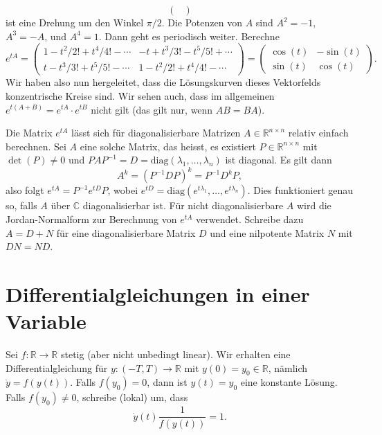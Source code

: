 \documentclass[../main.tex]{subfiles}
\begin{document}
\begin{examples}
\begin{enumerate}[(1)]
\[\begin{pmatrix}
        \end{pmatrix}
      \]
      ist eine Drehung um den Winkel $\pi/2$.
      Die Potenzen von $A$ sind
      $A^2 = -1$, $A^3 = -A$, und $A^4 = 1$.
      Dann geht es periodisch weiter.
      Berechne
      \[
        e^{tA} =
        \begin{pmatrix}
          1 - t^2/2! + t^4/4! -  \cdots
          & -t + t^3/3! - t^5/5! + \cdots \\
          t - t^3/3! + t^5/5! - \cdots
          &
          1 - t^2/2! + t^4/4! -  \cdots
        \end{pmatrix}
        =
        \begin{pmatrix}
          \cos(t) & -\sin(t) \\
          \sin(t) & \cos(t)
        \end{pmatrix}.
      \]
      Wir haben also nun hergeleitet, dass
      die Lösungskurven dieses Vektorfelds konzentrische
      Kreise sind.
      Wir sehen auch, dass im allgemeinen
      $e^{t(A + B)} = e^{tA} \cdot e^{tB}$ nicht gilt
      (das gilt nur, wenn $AB = BA$).
  \end{enumerate}
\end{examples}

\begin{remark}
Die Matrix $e^{tA}$ lässt sich für diagonalisierbare
Matrizen $A \in \mathbb{R}^{n \times n}$ relativ einfach
berechnen. Sei $A$ eine solche Matrix, das heisst,
es existiert $P \in \mathbb{R}^{n \times n}$
mit
$\det(P) \neq 0$ und $PAP^{-1} = D = \text{diag}(\lambda_1, \dots, \lambda_n)$ 
ist diagonal.
Es gilt dann
\[
A^k = {(P^{-1}DP)}^k = P^{-1}D^k P,
\]
also folgt $e^{tA} = P^{-1}e^{tD}P$, wobei
$e^{tD} = \text{diag}(e^{t\lambda_1}, \dots, e^{t \lambda_n})$.
Dies funktioniert genau so, falls $A$ über $\mathbb{C}$ 
diagonalisierbar ist.
Für nicht diagonalisierbare $A$ wird die Jordan-Normalform
zur Berechnung von $e^{tA}$ verwendet.
Schreibe dazu $A = D + N$ für eine diagonalisierbare
Matrix $D$ und eine nilpotente Matrix $N$ mit
$DN = ND$.
\end{remark}

\section{Differentialgleichungen in einer Variable}
Sei $f \colon \mathbb{R} \to \mathbb{R}$ stetig
(aber nicht unbedingt linear).
Wir erhalten eine Differentialgleichung
für $y \colon (-T, T) \to \mathbb{R}$ 
mit $y(0) = y_0 \in \mathbb{R}$,
nämlich $\dot y = f(y(t))$.
Falls $f(y_0) = 0$, dann ist
$y(t) = y_0$ eine konstante Lösung.
Falls $f(y_0) \neq 0$, schreibe (lokal) um, dass
\[
  \dot y(t) \frac{1}{f(y(t))} = 1.
\]
\end{document}
